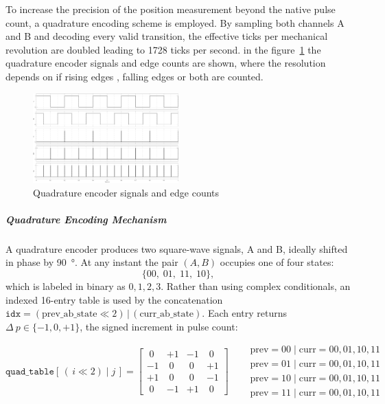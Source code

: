 To increase the precision of the position measurement beyond the native pulse count, a quadrature encoding scheme is employed. By sampling both channels A and B and decoding every valid transition, the effective ticks per mechanical revolution are doubled leading to 1728 ticks per second. in the figure~\ref{fig:quad} the quadrature encoder signals and edge counts are shown, where the resolution depends on if rising edges , falling edges or both are counted.

\begin{figure}[H]
  \centering
  \includegraphics[width=0.5\textwidth]{imgs/quad.png}
  \caption{Quadrature encoder signals and edge counts}
  \label{fig:quad}
\end{figure}

\subparagraph*{Quadrature Encoding Mechanism}
A quadrature encoder produces two square-wave signals, A and B, ideally shifted in phase by \SI{90}{\degree}. At any instant the pair \((A,B)\) occupies one of four states:
\[
  \{00,\;01,\;11,\;10\},
\]
which is labeled in binary as \(0,1,2,3\).
Rather than using complex conditionals, an indexed 16-entry table is used by the concatenation \(\mathtt{idx} = (\text{prev\_ab\_state}\ll2)\,\vert\,(\text{curr\_ab\_state})\). Each entry returns \(\Delta~\!p\in\{-1,0,+1\}\), the signed increment in pulse count:

\[
  \mathtt{quad\_table}[\,(\,i\!\ll\!2)\mid j\,]
  =
  \begin{bmatrix}
    \;0 & +1  & -1  & \;0 \\
    -1  & \;0 & \;0 & +1  \\
    +1  & \;0 & \;0 & -1  \\
    \;0 & -1  & +1  & \;0
  \end{bmatrix}
  \quad
  \begin{aligned}
     & \text{prev}=00\;\big|\;\text{curr}=00,01,10,11 \\
     & \text{prev}=01\;\big|\;\text{curr}=00,01,10,11 \\
     & \text{prev}=10\;\big|\;\text{curr}=00,01,10,11 \\
     & \text{prev}=11\;\big|\;\text{curr}=00,01,10,11
  \end{aligned}
\]

